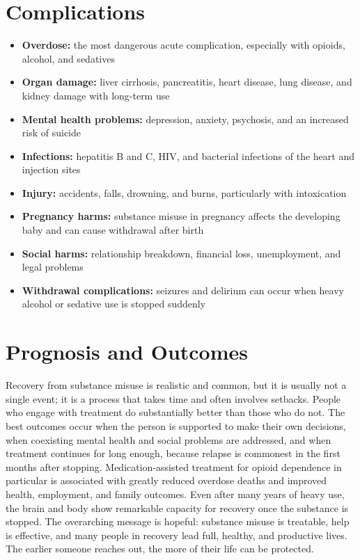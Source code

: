 \section*{Complications}
\begin{itemize}
    \item \textbf{Overdose:} the most dangerous acute complication, especially with opioids, alcohol, and sedatives
    \item \textbf{Organ damage:} liver cirrhosis, pancreatitis, heart disease, lung disease, and kidney damage with long-term use
    \item \textbf{Mental health problems:} depression, anxiety, psychosis, and an increased risk of suicide
    \item \textbf{Infections:} hepatitis B and C, HIV, and bacterial infections of the heart and injection sites
    \item \textbf{Injury:} accidents, falls, drowning, and burns, particularly with intoxication
    \item \textbf{Pregnancy harms:} substance misuse in pregnancy affects the developing baby and can cause withdrawal after birth
    \item \textbf{Social harms:} relationship breakdown, financial loss, unemployment, and legal problems
    \item \textbf{Withdrawal complications:} seizures and delirium can occur when heavy alcohol or sedative use is stopped suddenly
\end{itemize}

\section*{Prognosis and Outcomes}
Recovery from substance misuse is realistic and common, but it is usually not a single event; it is a process that takes time and often involves setbacks. People who engage with treatment do substantially better than those who do not. The best outcomes occur when the person is supported to make their own decisions, when coexisting mental health and social problems are addressed, and when treatment continues for long enough, because relapse is commonest in the first months after stopping. Medication-assisted treatment for opioid dependence in particular is associated with greatly reduced overdose deaths and improved health, employment, and family outcomes. Even after many years of heavy use, the brain and body show remarkable capacity for recovery once the substance is stopped. The overarching message is hopeful: substance misuse is treatable, help is effective, and many people in recovery lead full, healthy, and productive lives. The earlier someone reaches out, the more of their life can be protected.

